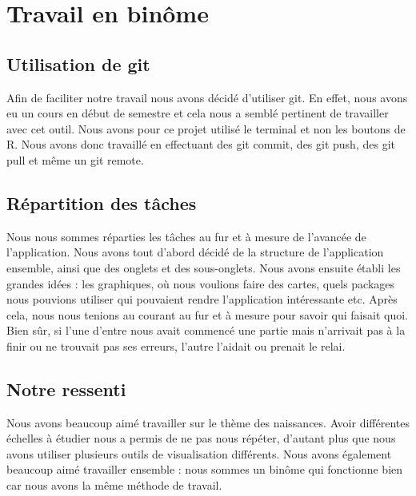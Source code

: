 \documentclass[
]{article}
\begin{document}
\hypertarget{travail-en-binuxf4me}{%
\section{Travail en binôme}\label{travail-en-binuxf4me}}

\hypertarget{utilisation-de-git}{%
\subsection{Utilisation de git}\label{utilisation-de-git}}

Afin de faciliter notre travail nous avons décidé d'utiliser git. En
effet, nous avons eu un cours en début de semestre et cela nous a semblé
pertinent de travailler avec cet outil. Nous avons pour ce projet
utilisé le terminal et non les boutons de R. Nous avons donc travaillé
en effectuant des git commit, des git push, des git pull et même un git
remote.

\hypertarget{ruxe9partition-des-tuxe2ches}{%
\subsection{Répartition des tâches}\label{ruxe9partition-des-tuxe2ches}}

Nous nous sommes réparties les tâches au fur et à mesure de l'avancée de
l'application. Nous avons tout d'abord décidé de la structure de
l'application ensemble, ainsi que des onglets et des sous-onglets. Nous
avons ensuite établi les grandes idées : les graphiques, où nous
voulions faire des cartes, quels packages nous pouvions utiliser qui
pouvaient rendre l'application intéressante etc. Après cela, nous nous
tenions au courant au fur et à mesure pour savoir qui faisait quoi. Bien
sûr, si l'une d'entre nous avait commencé une partie mais n'arrivait pas
à la finir ou ne trouvait pas ses erreurs, l'autre l'aidait ou prenait
le relai.

\hypertarget{notre-ressenti}{%
\subsection{Notre ressenti}\label{notre-ressenti}}

Nous avons beaucoup aimé travailler sur le thème des naissances. Avoir
différentes échelles à étudier nous a permis de ne pas nous répéter,
d'autant plus que nous avons utiliser plusieurs outils de visualisation
différents. Nous avons également beaucoup aimé travailler ensemble :
nous sommes un binôme qui fonctionne bien car nous avons la même méthode
de travail.
\end{document}
